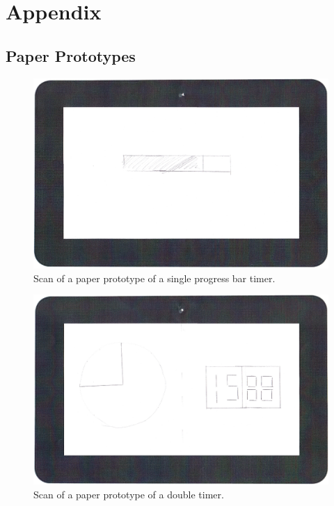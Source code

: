 \chapter*{Appendix}

\section{Paper Prototypes}
\label{sec:paper_prot}

	\begin{figure}[H]
		\centering
			\includegraphics[width=\textwidth]{Images/paper_prototype/timer_1.png}
				\caption{Scan of a paper prototype of a single progress bar timer.}
		\label{fig:pap_prot_progbar}
	\end{figure}
	
	\begin{figure}[H]
		\centering
			\includegraphics[width=\textwidth]{Images/paper_prototype/timer_2.png}
				\caption{Scan of a paper prototype of a double timer.}
		\label{fig:pap_prot_timedoub1}
	\end{figure}

